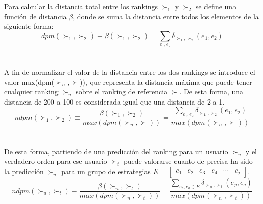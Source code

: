 \\ \\
Para calcular la distancia total entre los rankings $\succ_1$ y $\succ_2$ se define una función de distancia $\beta$, donde se suma la distancia entre todos los elementos de la siguiente forma:
\[  
        dpm(\succ_1, \succ_2) \equiv \beta(\succ_1, \succ_2) = \sum\limits_{e_1, e_2} \delta_{\succ_1, \succ_2}(e_1, e_2)
\]
\\ \\
A fin de normalizar el valor de la distancia entre los dos rankings se introduce el valor max(dpm($\succ_n, \succ$)), que representa la distancia máxima que puede tener cualquier ranking $\succ_n$ sobre el ranking de referencia $\succ$. De esta forma, una distancia de 200 a 100 es considerada igual que una distancia de 2 a 1.
\[  
        ndpm(\succ_1, \succ_2) \equiv \frac{\beta(\succ_1, \succ_2)}{max(dpm(\succ_n, \succ))} = \frac{\sum\limits_{e_1, e_2} \delta_{\succ_1, \succ_2}(e_1, e_2)}{max(dpm(\succ_n, \succ))}
\]
\\ \\
De esta forma, partiendo de una predicción del ranking para un usuario $\succ_u$ y el verdadero orden para ese usuario $\succ_t$ puede valorarse cuanto de precisa ha sido la predicción $\succ_u$ para un grupo de estrategias \textit{E} = $\begin{bmatrix} \textit{e$_{1}$} & \textit{e$_{2}$} & \textit{e$_{3}$} & \textit{e$_{4}$} & \cdots & \textit{e$_{j}$} \end{bmatrix}$.
\[  
        ndpm(\succ_u, \succ_t) \equiv \frac{\beta(\succ_u, \succ_t)}{max(dpm(\succ_n, \succ_t))} = \frac{\sum\limits_{e_p, e_q \in E} \delta_{\succ_u, \succ_t}(e_p, e_q)}{max(dpm(\succ_n, \succ_t))}
\]